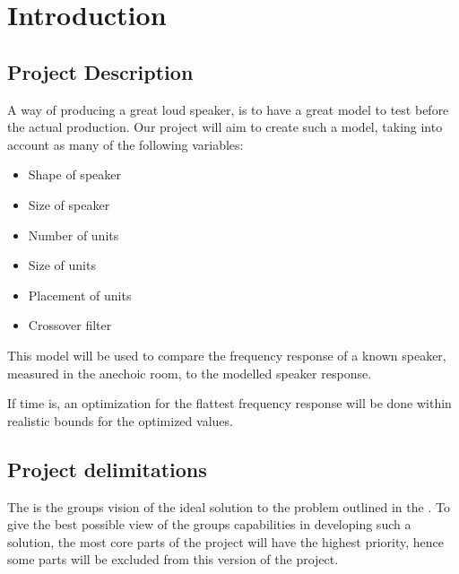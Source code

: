 
\chapter{Introduction}
\label{sec:introduction}

\section{Project Description}
\label{sec:projectDescription}
A way of producing a great loud speaker, is to have a great model to test before the actual production. Our project will aim to create such a model, taking into account as many of the following variables:

\begin{itemize}
	\item Shape of speaker
	\item Size of speaker
	\item Number of units
	\item Size of units
	\item Placement of units
	\item Crossover filter
\end{itemize}

This model will be used to compare the frequency response of a known speaker, measured in the anechoic room, to the modelled speaker response.

If time is, an optimization for the flattest frequency response will be done within realistic bounds for the optimized values.


\section{Project delimitations}
\label{sec:delimitations}
The  is the groups vision of the ideal solution to the problem outlined in the .  
To give the best possible view of the groups capabilities in developing such a solution, the most core parts of the project will have the highest priority, hence some parts will be excluded from this version of the project.

